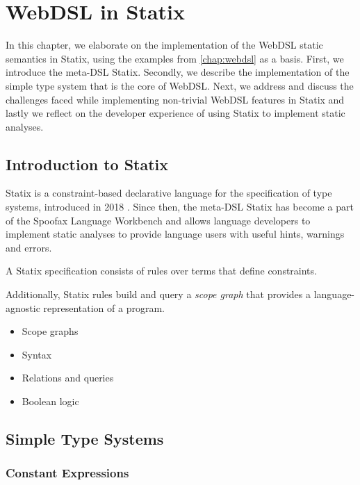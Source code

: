 
\chapter{\label{chap:statix}WebDSL in Statix}

  In this chapter, we elaborate on the implementation of the WebDSL static semantics in Statix, using the examples from \cref{chap:webdsl} as a basis. First, we introduce the meta-DSL Statix. Secondly, we describe the implementation of the simple type system that is the core of WebDSL. Next, we address and discuss the challenges faced while implementing non-trivial WebDSL features in Statix and lastly we reflect on the developer experience of using Statix to implement static analyses.

  \section{\label{sec:statix}Introduction to Statix}

    Statix is a constraint-based declarative language for the specification of type systems, introduced in 2018 \autocite{VanAntwerpen2018}. Since then, the meta-DSL Statix has become a part of the Spoofax Language Workbench and allows language developers to implement static analyses to provide language users with useful hints, warnings and errors.

    A Statix specification consists of rules over terms that define constraints.

    Additionally, Statix rules build and query a \textit{scope graph} \autocite{Neron2015} that provides a language-agnostic representation of a program.

    \begin{itemize}
      \item Scope graphs
      \item Syntax
      \item Relations and queries
      \item Boolean logic
    \end{itemize}
  
  \section{\label{sec:simple-type-systems}Simple Type Systems}

    \subsection{\label{subsec:simple-constants}Constant Expressions}

